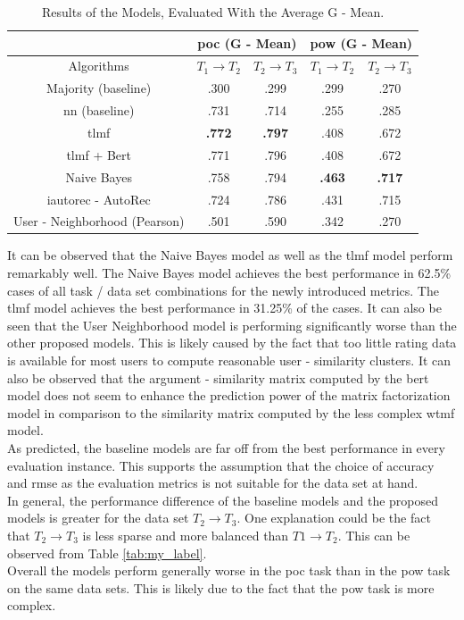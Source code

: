 \begin{table}[h!]
    \centering
    \begin{tabular}{|c|c|c|c|c|}
    \hline
     & \multicolumn{2}{|c|}{\acrshort{poc} (G - Mean)} & \multicolumn{2}{|c|}{\acrshort{pow} (G - Mean)} \\
     \hline
    Algorithms & $T_1 \to T_2$ & $T_2 \to T_3$ & $T_1 \to T_2$ & $T_2 \to T_3$\\
    \hline  Majority (baseline) & .300 & .299 & .299 & .270 \\ 
    \acrshort{nn} (baseline) & .731 & .714 & .255 & .285\\
    \acrshort{tlmf} & \textbf{.772} & \textbf{.797} & .408 & .672 \\
    \acrshort{tlmf} + Bert & .771 & .796 & .408 & .672\\
    Naive Bayes & .758 & .794 & \textbf{.463} & \textbf{.717} \\
    \acrshort{iautorec} - AutoRec & .724 & .786 & .431 & .715\\
    User - Neighborhood (Pearson) & .501 & .590 & .342 & .270\\
    \hline
    \end{tabular}
    \caption{Results of the Models, Evaluated With the Average G - Mean.}
    \label{tab:results_g_mean}
\end{table}
\noindent It can be observed that the Naive Bayes model as well as the \acrshort{tlmf} model perform remarkably well. The Naive Bayes model achieves the best performance in 62.5\% cases of all task / data set combinations for the newly introduced metrics. The \acrshort{tlmf} model achieves the best performance in 31.25\% of the cases. It can also be seen that the User Neighborhood model is performing significantly worse than the other proposed models. This is likely caused by the fact that too little rating data is available for most users to compute reasonable user - similarity clusters.
It can also be observed that the argument - similarity matrix computed by the \acrshort{bert} model does not seem to enhance the prediction power of the matrix factorization model in comparison to the similarity matrix computed by the less complex \acrshort{wtmf} model.\\
As predicted, the baseline models are far off from the best performance in every evaluation instance. This supports the assumption that the choice of accuracy and \acrshort{rmse} as the evaluation metrics is not suitable for the data set at hand.\\
In general, the performance difference of the baseline models and the proposed models is greater for the data set $T_2 \to T_3$. One explanation could be the fact that $T_2 \to T_3$ is less sparse and more balanced than $T1 \to T_2$. This can be observed from Table \ref{tab:my_label}.\\
Overall the models perform generally worse in the \acrshort{poc} task than in the \acrshort{pow} task on the same data sets. This is likely due to the fact that the \acrshort{pow} task is more complex.

